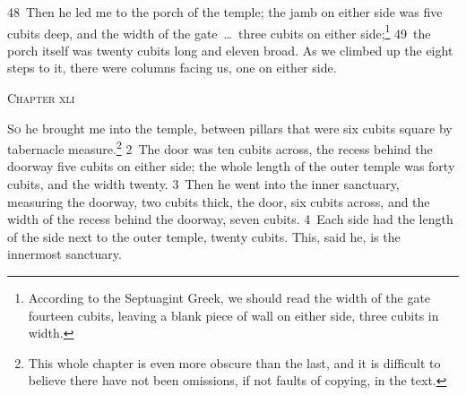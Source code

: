 \documentclass[10pt]{book} %
\begin{document}
\textcolor{benred8}{48}~Then he led me to the porch of the temple; the jamb on either side was five cubits deep, and the width of the gate~\ldots\  three cubits on either side;\footnote[9]{According to the Septuagint Greek, we should read \textasciigrave the width of the gate fourteen cubits, leaving a blank piece of wall on either side, three cubits in width\textquotesingle .} \textcolor{benred8}{49}~the porch itself was twenty cubits long and eleven broad. As we climbed up the eight steps to it, there were columns facing us, one on either side.
\begin{large}\begin{center}\textsc{Chapter xli}\end{center}\end{large}
\lettrine[lines=2]{S}{o} he brought me into the temple, between pillars that were six cubits square by tabernacle measure.\footnote[1]{This whole chapter is even more obscure than the last, and it is difficult to believe there have not been omissions, if not faults of copying, in the text.} \textcolor{benred8}{2}~The door was ten cubits across, the recess behind the doorway five cubits on either side; the whole length of the outer temple was forty cubits, and the width twenty. \textcolor{benred8}{3}~Then he went into the inner sanctuary, measuring the doorway, two cubits thick, the door, six cubits across, and the width of the recess behind the doorway, seven cubits. \textcolor{benred8}{4}~Each side had the length of the side next to the outer temple, twenty cubits. This, said he, is the innermost sanctuary.
\end{document}
